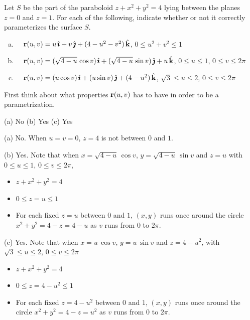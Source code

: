 \begin{question}[M317 2005D] %
Let $S$ be the part of the paraboloid $z + x^2 + y^2 = 4$ lying between
the planes $z = 0$ and $z = 1$. For each of the following, indicate 
whether or not it correctly parameterizes the surface $S$.
\begin{enumerate}[(a)]
\item\ \ 
$\mathbf{r}(u,v) = u\,\hat{\pmb{\imath}} + v\,\hat{\pmb{\jmath}} + (4 - u^2 - v^2)\,\hat{\mathbf{k}}$,\qquad
$0 \le u^2 + v^2 \le 1$
\item\ \ 
$\mathbf{r}(u,v) = (\sqrt{4-u}\,\cos v)\,\hat{\pmb{\imath}} + (\sqrt{4-u}\, \sin v)\,\hat{\pmb{\jmath}} + u\,\hat{\mathbf{k}}$,
\qquad
$0 \le u \le 1$, $0 \le v \le 2\pi$
\item\ \ 
$\mathbf{r}(u, v) = (u \cos v)\,\hat{\pmb{\imath}} + (u \sin v)\,\hat{\pmb{\jmath}} + (4 - u^2 )\,\hat{\mathbf{k}}$,\qquad
$\sqrt{3} \le u \le 2$, $0 \le v \le 2\pi$
\end{enumerate}
\end{question}

\begin{hint} 
First think about what properties $\mathbf{r}(u,v)$ has to have in order to be
a parametrization.
\end{hint}

\begin{answer} 
(a) No\qquad
(b) Yes\qquad
(c) Yes
\end{answer}

\begin{solution}
(a) No. When $u=v=0$, $z=4$ is not between $0$ and $1$.

(b) Yes. Note that when $x=\sqrt{4-u}\,\cos v$,
                        $y=\sqrt{4-u}\,\sin v$ and
                        $z= u$ with
                        $0 \le u \le 1$, $0 \le v \le 2\pi$,
\begin{itemize}\itemsep1pt \parskip0pt \parsep0pt %
\item[$\circ$]
  $z+x^2+y^2=4$
\item[$\circ$]
  $0\le z=u\le 1$
\item[$\circ$]
  For each fixed $z=u$ between $0$ and $1$,
  $(x,y)$ runs once around the circle $x^2+y^2 =4-z =4-u$
   as $v$ runs from $0$ to $2\pi$.
\end{itemize}

(c) Yes. Note that when $x=u\,\cos v$,
                        $y=u\,\sin v$ and
                        $z= 4-u^2$, with
                        $\sqrt{3} \le u \le 2$, $0 \le v \le 2\pi$
\begin{itemize}\itemsep1pt \parskip0pt  %
\item[$\circ$]
  $z+x^2+y^2=4$
\item[$\circ$]
  $0\le z=4-u^2\le 1$
\item[$\circ$]
  For each fixed $z=4-u^2$ between $0$ and $1$,
  $(x,y)$ runs once around the circle $x^2+y^2 =4-z =u^2$
   as $v$ runs from $0$ to $2\pi$.
\end{itemize}

\end{solution}


